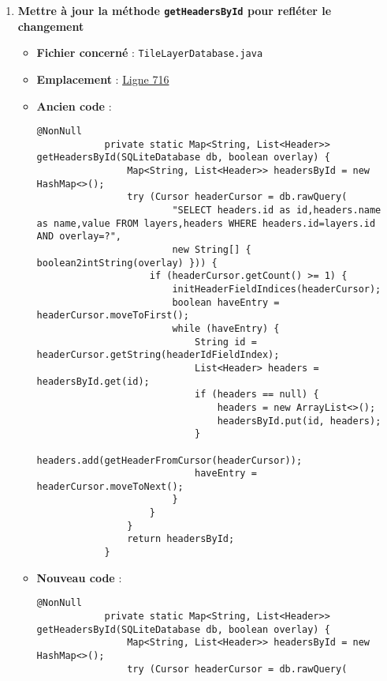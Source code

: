 \begin{enumerate}
    \item \textbf{Mettre à jour la méthode \texttt{getHeadersById} pour refléter le changement}
          \begin{itemize}
              \item \textbf{Fichier concerné} : \texttt{TileLayerDatabase.java}
              \item \textbf{Emplacement} : \href{https://github.com/MarcusWolschon/osmeditor4android/blob/dcabe8084aa15f5551a37c990516bf73398af1bf/src/main/java/de/blau/android/resources/TileLayerDatabase.java#L716}{Ligne 716}
              \item \textbf{Ancien code} :
                    \begin{lstlisting}[style=Java, caption=Ancien code]
            @NonNull
            private static Map<String, List<Header>> getHeadersById(SQLiteDatabase db, boolean overlay) {
                Map<String, List<Header>> headersById = new HashMap<>();
                try (Cursor headerCursor = db.rawQuery(
                        "SELECT headers.id as id,headers.name as name,value FROM layers,headers WHERE headers.id=layers.id AND overlay=?",
                        new String[] { boolean2intString(overlay) })) {
                    if (headerCursor.getCount() >= 1) {
                        initHeaderFieldIndices(headerCursor);
                        boolean haveEntry = headerCursor.moveToFirst();
                        while (haveEntry) {
                            String id = headerCursor.getString(headerIdFieldIndex);
                            List<Header> headers = headersById.get(id);
                            if (headers == null) {
                                headers = new ArrayList<>();
                                headersById.put(id, headers);
                            }
                            headers.add(getHeaderFromCursor(headerCursor));
                            haveEntry = headerCursor.moveToNext();
                        }
                    }
                }
                return headersById;
            }
        \end{lstlisting}
              \item \textbf{Nouveau code} :
                    \begin{lstlisting}[style=Java, caption=Nouveau code]
            @NonNull
            private static Map<String, List<Header>> getHeadersById(SQLiteDatabase db, boolean overlay) {
                Map<String, List<Header>> headersById = new HashMap<>();
                try (Cursor headerCursor = db.rawQuery(

\end{lstlisting}
\end{itemize}
\end{enumerate}
